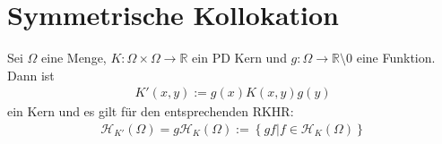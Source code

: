 \section{Symmetrische Kollokation}
\begin{theorem}
\label{thm:gewichtKern}
Sei $\Omega$ eine Menge, $K:\Omega \times \Omega \rightarrow \mathbb{R}$ ein \ac{PD} Kern und $g:\Omega \rightarrow \mathbb{R} \setminus {0}$ eine Funktion. Dann ist 
\begin{align*}
K'(x,y) := g(x)K(x,y)g(y)
\end{align*}
ein Kern und es gilt für den entsprechenden \ac{RKHR}:
\begin{align*}
\mathcal{H}_{K'}(\Omega) = g \mathcal{H}_K(\Omega) := \left\{ gf|f \in \mathcal{H}_K(\Omega)\right\}
\end{align*}
\end{theorem}
